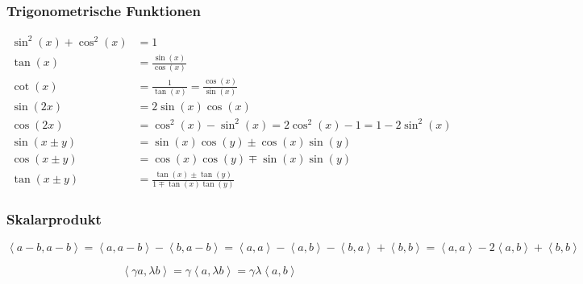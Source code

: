 \subsubsection{Trigonometrische Funktionen}
\begin{equation*}
    \begin{split}
        \sin^2(x)+\cos^2(x) &= 1\\
        \tan(x) &= \frac{\sin(x)}{\cos(x)}\\
        \cot(x) &= \frac{1}{\tan(x)} = \frac{\cos(x)}{\sin(x)}\\
        \sin(2x) &= 2\sin(x)\cos(x)\\
        \cos(2x) &= \cos^2(x)-\sin^2(x) = 2\cos^2(x)-1 = 1-2\sin^2(x)\\
        \sin(x\pm y) &= \sin(x)\cos(y)\pm\cos(x)\sin(y)\\
        \cos(x\pm y) &= \cos(x)\cos(y)\mp\sin(x)\sin(y)\\
        \tan(x\pm y) &= \frac{\tan(x)\pm\tan(y)}{1\mp\tan(x)\tan(y)}
    \end{split}
\end{equation*}

\subsubsection{Skalarprodukt}
\label{skalarprodukt}

\begin{equation*}
    \left\langle a-b, a-b\right\rangle = \left\langle a, a-b\right\rangle - \left\langle b, a-b\right\rangle = \left\langle a, a\right\rangle - \left\langle a, b\right\rangle - \left\langle b, a\right\rangle + \left\langle b, b\right\rangle = \left\langle a, a\right\rangle - 2\left\langle a, b\right\rangle + \left\langle b, b\right\rangle
\end{equation*}

\begin{equation*}
    \left\langle \gamma a, \lambda b\right\rangle = \gamma\left\langle a, \lambda b\right\rangle = \gamma\lambda\left\langle a, b\right\rangle
\end{equation*}
